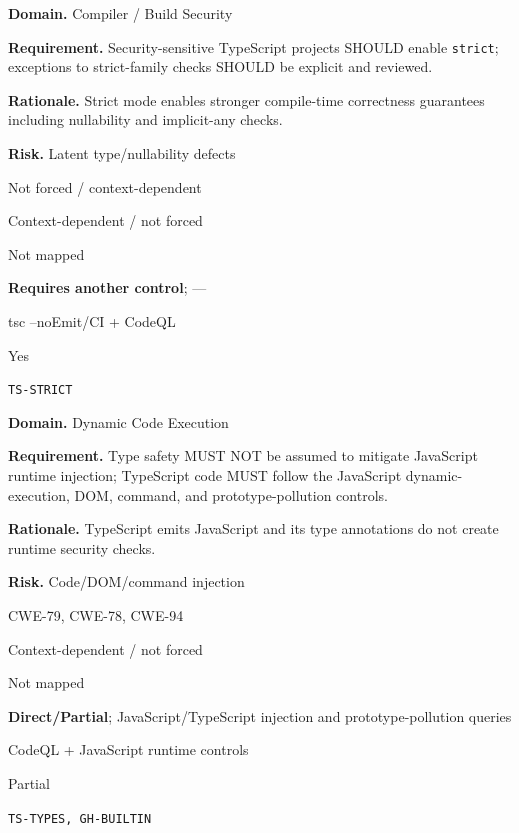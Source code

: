 \documentclass[10pt,letterpaper]{article}
\newcommand{\code}[1]{\texttt{\small #1}}
\newcommand{\prioritybadge}[2]{\tcbox[on line,boxrule=0pt,arc=1.2mm,boxsep=0.7mm,left=1mm,right=1mm,top=0.4mm,bottom=0.4mm,colback=#2!12,coltext=#2]{\scriptsize\bfseries #1}}
\begin{document}
\begin{rulebox}[title={\texttt{SCS-TS-BUILD-001} \hfill \prioritybadge{High Priority}{High}}]
\textbf{Domain.} Compiler / Build Security

\textbf{Requirement.} Security-sensitive TypeScript projects SHOULD enable \code{strict}; exceptions to strict-family checks SHOULD be explicit and reviewed.

\textbf{Rationale.} Strict mode enables stronger compile-time correctness guarantees including nullability and implicit-any checks.

\textbf{Risk.} Latent type/nullability defects

\begin{description}[leftmargin=2.65cm,labelwidth=2.3cm,style=nextline,itemsep=1pt,topsep=3pt]
  \item[CWE] Not forced / context-dependent
  \item[OWASP] Context-dependent / not forced
  \item[CERT] Not mapped
  \item[CodeQL] \textbf{Requires another control}; ---
  \item[Enforcement] tsc --noEmit/CI + CodeQL
  \item[Automation] Yes
  \item[Sources] \texttt{TS-STRICT}
\end{description}
\end{rulebox}

\begin{rulebox}[title={\texttt{SCS-TS-DYN-001} \hfill \prioritybadge{Critical Control}{Critical}}]
\textbf{Domain.} Dynamic Code Execution

\textbf{Requirement.} Type safety MUST NOT be assumed to mitigate JavaScript runtime injection; TypeScript code MUST follow the JavaScript dynamic-execution, DOM, command, and prototype-pollution controls.

\textbf{Rationale.} TypeScript emits JavaScript and its type annotations do not create runtime security checks.

\textbf{Risk.} Code/DOM/command injection

\begin{description}[leftmargin=2.65cm,labelwidth=2.3cm,style=nextline,itemsep=1pt,topsep=3pt]
  \item[CWE] CWE-79, CWE-78, CWE-94
  \item[OWASP] Context-dependent / not forced
  \item[CERT] Not mapped
  \item[CodeQL] \textbf{Direct/Partial}; JavaScript/TypeScript injection and prototype-pollution queries
  \item[Enforcement] CodeQL + JavaScript runtime controls
  \item[Automation] Partial
  \item[Sources] \texttt{TS-TYPES, GH-BUILTIN}
\end{description}
\end{rulebox}
\end{document}
